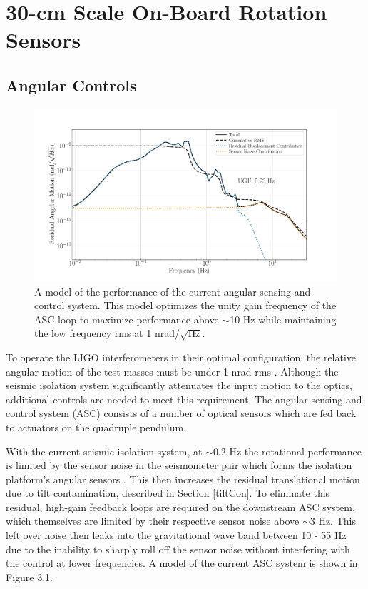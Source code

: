\documentclass [12pt, proquest]{uwthesis}[2019]
\begin{document}
\chapter{30-cm Scale On-Board Rotation Sensors}\label{cBRS_chap}
\section{Angular Controls}\label{ASC}
\begin{figure}[!h]
\begin{center}
\includegraphics[width=\textwidth]{cBRS_ASC_Without.pdf}
\caption[Model of the performance of the current angular sensing and control system]{A model of the performance of the current angular sensing and control system. This model optimizes the unity gain frequency of the ASC loop to maximize performance above $\sim$10 Hz while maintaining the low frequency rms at 1 nrad/$\sqrt{\text{Hz}}$.}
\label{ascWithout}
\end{center}
\end{figure}
To operate the LIGO interferometers in their optimal configuration, the relative angular motion of the test masses must be under 1 nrad rms \cite{ASC}. Although the seismic isolation system significantly attenuates the input motion to the optics, additional controls are needed to meet this requirement. The angular sensing and control system (ASC) consists of a number of optical sensors which are fed back to actuators on the quadruple pendulum. 

With the current seismic isolation system, at $\sim$0.2 Hz the rotational performance is limited by the sensor noise in the seismometer pair which forms the isolation platform's angular sensors \cite{windproofing}. This then increases the residual translational motion due to tilt contamination, described in Section \ref{tiltCon}. To eliminate this residual, high-gain feedback loops are required on the downstream ASC system, which themselves are limited by their respective sensor noise above $\sim$3 Hz. This left over noise then leaks into the gravitational wave band between 10 - 55 Hz due to the inability to sharply roll off the sensor noise without interfering with the control at lower frequencies. A model of the current ASC system is shown in Figure 3.1.
\end{document}
